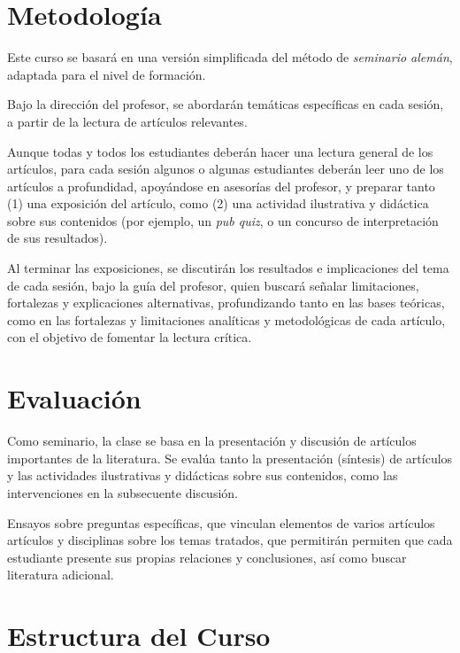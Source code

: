 \documentclass[11pt,a4paper,]{awesome-cv}
\begin{document}
\hypertarget{metodologuxeda}{%
\section{Metodología}\label{metodologuxeda}}

Este curso se basará en una versión simplificada del método de
\textit{seminario alemán}, adaptada para el nivel de formación.

Bajo la dirección del profesor, se abordarán temáticas específicas en
cada sesión, a partir de la lectura de artículos relevantes.

Aunque todas y todos los estudiantes deberán hacer una lectura general
de los artículos, para cada sesión algunos o algunas estudiantes deberán
leer uno de los artículos a profundidad, apoyándose en asesorías del
profesor, y preparar tanto (1) una exposición del artículo, como (2) una
actividad ilustrativa y didáctica sobre sus contenidos (por ejemplo, un
\textit{pub quiz}, o un concurso de interpretación de sus resultados).

Al terminar las exposiciones, se discutirán los resultados e
implicaciones del tema de cada sesión, bajo la guía del profesor, quien
buscará señalar limitaciones, fortalezas y explicaciones alternativas,
profundizando tanto en las bases teóricas, como en las fortalezas y
limitaciones analíticas y metodológicas de cada artículo, con el
objetivo de fomentar la lectura crítica.

\hypertarget{evaluaciuxf3n}{%
\section{Evaluación}\label{evaluaciuxf3n}}

Como seminario, la clase se basa en la presentación y discusión de
artículos importantes de la literatura. Se evalúa tanto la presentación
(síntesis) de artículos y las actividades ilustrativas y didácticas
sobre sus contenidos, como las intervenciones en la subsecuente
discusión.

Ensayos sobre preguntas específicas, que vinculan elementos de varios
artículos artículos y disciplinas sobre los temas tratados, que
permitirán permiten que cada estudiante presente sus propias relaciones
y conclusiones, así como buscar literatura adicional.

\hypertarget{estructura-del-curso}{%
\section{Estructura del Curso}\label{estructura-del-curso}}
\end{document}
